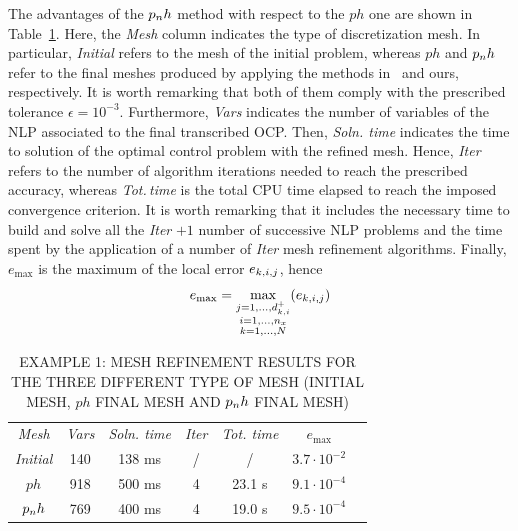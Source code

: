 The advantages of the $p_{n}h$ method with respect to the $ph$ one are shown in Table~\ref{tab:tablevanderpol}. Here, the \emph{Mesh} column indicates the type of discretization mesh. In particular, \emph{Initial} refers to the mesh of the initial problem, whereas $ph$ and $p_{n}h$ refer to the final meshes produced by applying the methods in~\cite{Patterson:OCAM:2015} and ours, respectively. It is worth remarking that both of them comply with the prescribed tolerance $\epsilon=10^{-3}$. Furthermore, \emph{Vars} indicates the number of variables of the NLP associated to the final transcribed OCP. Then, \emph{Soln. time} indicates the time to solution of the optimal control problem with the refined mesh. Hence, \emph{Iter} refers to the number of algorithm iterations needed to reach the prescribed accuracy, whereas \emph{Tot.\,time} is the total CPU time elapsed to reach the imposed convergence criterion. It is worth remarking that it includes the necessary time to build and solve all the \emph{Iter} $+1$ number of successive NLP problems and the time spent by the application of a number of \emph{Iter} mesh refinement algorithms. Finally, $e_{\max}$  is the maximum of the local error $e_{k,i,j}$, hence
\begin{equation}
e_\text{max}= \max\limits_{\substack{j = 1, \dots, d_{k,i}^{+} \\ i = 1, \dots, n_x \\ k = 1, \dots, N}} (e_{k,i,j})
\end{equation}
\begin{table}[t]
	\caption{EXAMPLE 1: MESH REFINEMENT RESULTS FOR THE THREE DIFFERENT TYPE OF MESH (INITIAL MESH, $ph$ FINAL MESH AND $p_{n}h$ FINAL MESH)}
	\begin{center}
		\label{tab:tablevanderpol}
		\begin{tabular}{c c c c c c c}
			& & \\ %
			\hline
			\emph{Mesh} & \emph{Vars} & \emph{Soln. time} & \emph{Iter} & \emph{Tot. time} & $e_\text{max}$ \\
			\hline
			\emph{Initial} & 140 & 138 ms & / & / &  $3.7\cdot 10^{-2}$\\
			$ph$ & 918 & 500 ms & 4 & 23.1 s & $9.1\cdot 10^{-4}$ \\
			$p_{n}h$ & 769 & 400 ms & 4 & 19.0 s & $9.5\cdot 10^{-4}$ \\
			\hline
		\end{tabular}
	\end{center}
\end{table}
